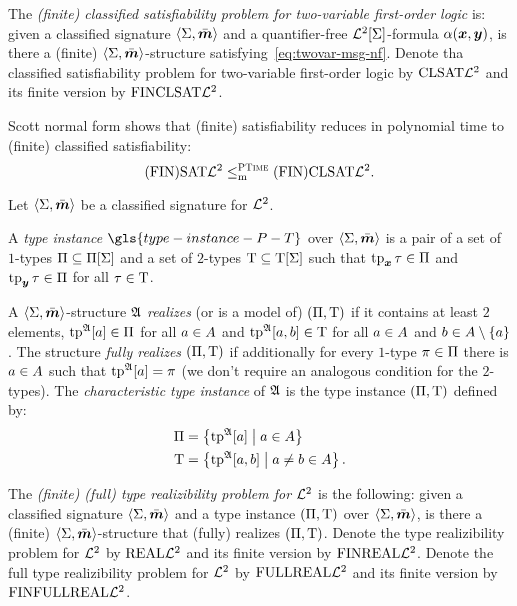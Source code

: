 \begin{definition}
The \emph{(finite) classified satisfiability problem for two-variable
first-order logic} is:
given a classified signature $\left\langle \mathrm{\Sigma},\bar{\bm{m}} \right\rangle$ and a quantifier-free
$\mathcal{L}^{2}[\mathrm{\Sigma}]$-formula $\alpha(\bm{x},\bm{y})$, is there a (finite)
$\left\langle \mathrm{\Sigma},\bar{\bm{m}} \right\rangle$-structure satisfying~\cref{eq:twovar-msg-nf}.
Denote tha classified satisfiability problem for two-variable first-order logic
by $\mathrm{CLSAT}\mathcal{L}^{2}$ and its finite version by $\mathrm{FINCLSAT}\mathcal{L}^{2}$.
\end{definition}

Scott normal form shows that (finite) satisfiability reduces in polynomial time
to (finite) classified satisfiability:
\[
  \mathrm{(FIN)SAT}\mathcal{L}^{2} \leq_{\mathrm{m}}^{\text{\normalfont{\scshape PTime}}} \mathrm{(FIN)CLSAT}\mathcal{L}^{2}.
\]

Let $\left\langle \mathrm{\Sigma},\bar{\bm{m}} \right\rangle$ be a classified signature for $\mathcal{L}^{2}$.
\begin{definition}
A \emph{type instance} $\gls{type-instance-P-T}$ over $\left\langle \mathrm{\Sigma},\bar{\bm{m}} \right\rangle$ is a
pair of a set of $1$-types $\Pi \subseteq \Pi[\mathrm{\Sigma}]$ and a set of $2$-types
$\mathrm{T} \subseteq \mathrm{T}[\mathrm{\Sigma}]$ such that $\operatorname{tp}_{\bm{x}}\tau \in \Pi$ and $\operatorname{tp}_{\bm{y}}\tau \in
\Pi$ for all $\tau \in \mathrm{T}$.

A $\left\langle \mathrm{\Sigma},\bar{\bm{m}} \right\rangle$-structure $\mathfrak{A}$ \emph{realizes} (or is a model of)
$(\Pi,\mathrm{T})$ if it contains at least $2$ elements, $\operatorname{tp}^{\mathfrak{A}}[a] \in \Pi$
for all $a \in A$ and $\operatorname{tp}^{\mathfrak{A}}[a,b] \in \mathrm{T}$ for all $a \in A$
and $b \in A \setminus \left\{a\right\}$.
The structure \emph{fully realizes} $(\Pi,\mathrm{T})$ if additionally for every
$1$-type $\pi \in \Pi$ there is $a \in A$ such that $\operatorname{tp}^{\mathfrak{A}}[a] =
\pi$ (we don't require an analogous condition for the $2$-types).
The \emph{characteristic type instance} of $\mathfrak{A}$ is the type instance
$(\Pi,\mathrm{T})$ defined by:
\begin{align*}
\Pi &= \left\{\operatorname{tp}^{\mathfrak{A}}[a]\mathrel{}\middle|\mathrel{}a\in A\right\} \\
\mathrm{T} &= \left\{\operatorname{tp}^{\mathfrak{A}}[a,b]\mathrel{}\middle|\mathrel{}a\neq b \in A\right\}.
\end{align*}

The \emph{(finite) (full) type realizibility problem for $\mathcal{L}^{2}$} is the
following:
given a classified signature $\left\langle \mathrm{\Sigma},\bar{\bm{m}} \right\rangle$ and a type instance
$(\Pi,\mathrm{T})$ over $\left\langle \mathrm{\Sigma},\bar{\bm{m}} \right\rangle$, is there a (finite)
$\left\langle \mathrm{\Sigma},\bar{\bm{m}} \right\rangle$-structure that (fully) realizes $(\Pi,\mathrm{T})$.
Denote the type realizibility problem for $\mathcal{L}^{2}$ by
$\mathrm{REAL}\mathcal{L}^{2}$ and its finite version by $\mathrm{FINREAL}\mathcal{L}^{2}$.
Denote the full type realizibility problem for $\mathcal{L}^{2}$ by
$\mathrm{FULLREAL}\mathcal{L}^{2}$ and its finite version by $\mathrm{FINFULLREAL}\mathcal{L}^{2}$.
\end{definition}

